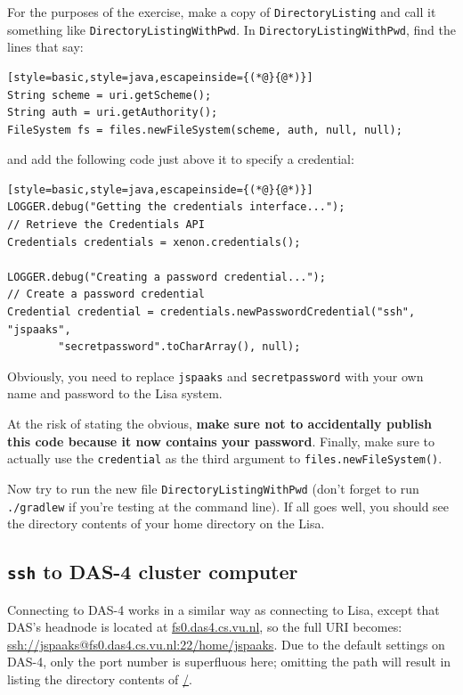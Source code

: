 \documentclass[12pt, a4paper, twoside, openany, titlepage]{book}
\begin{document}
For the purposes of the exercise, make a copy of \texttt{DirectoryListing} and call it something like \texttt{DirectoryListingWithPwd}. In \texttt{DirectoryListingWithPwd}, find the lines that say:
\begin{lstlisting}[style=basic,style=java,escapeinside={(*@}{@*)}]
String scheme = uri.getScheme();
String auth = uri.getAuthority();
FileSystem fs = files.newFileSystem(scheme, auth, null, null);
\end{lstlisting}

and add the following code just above it to specify a credential:
\begin{lstlisting}[style=basic,style=java,escapeinside={(*@}{@*)}]
LOGGER.debug("Getting the credentials interface...");
// Retrieve the Credentials API
Credentials credentials = xenon.credentials();

LOGGER.debug("Creating a password credential...");
// Create a password credential
Credential credential = credentials.newPasswordCredential("ssh", "jspaaks",
        "secretpassword".toCharArray(), null);
\end{lstlisting}

Obviously, you need to replace \texttt{jspaaks} and \texttt{secretpassword} with your own name and password to the Lisa system.

At the risk of stating the obvious, \textbf{make sure not to accidentally publish this code because it now contains your password}. Finally, make sure to actually use the \texttt{credential} as the third argument to \texttt{files.newFileSystem()}.

Now try to run the new file \texttt{DirectoryListingWithPwd} (don't forget to run \texttt{./gradlew} if you're testing at the command line). If all goes well, you should see the directory contents of your home directory on the Lisa.


\subsection{\texttt{ssh} to DAS-4 cluster computer}

Connecting to DAS-4 works in a similar way as connecting to Lisa, except that DAS's headnode is located at \url{fs0.das4.cs.vu.nl}, so the full URI becomes:\\ \url{ssh://jspaaks@fs0.das4.cs.vu.nl:22/home/jspaaks}. Due to the default settings on DAS-4, only the port number is superfluous here; omitting the path will result in listing the directory contents of \url{/}.
\end{document}
